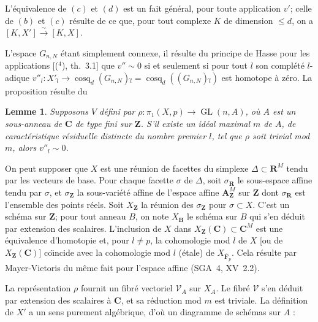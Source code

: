 \documentclass[10pt]{amsart}
\theoremstyle{plain}
\newtheorem*{lemme}{Lemme}
\theoremstyle{remark}
\DeclareMathOperator{\cosq}{cosq}
\begin{document}
\vspace{0.3\baselineskip}

L'\'{e}quivalence de $(c)$ et $(d)$ est un fait g\'{e}n\'{e}ral, pour toute application $v'$; celle de $(b)$ et $(c)$ r\'{e}sulte de ce que, pour tout complexe $K$ de dimension $\le d$, on a $[K,X']\xrightarrow{\sim}[K,X]$.

L'espace $G_{n,N}$ \'{e}tant simplement connexe, il r\'{e}sulte du principe de Hasse pour les applications [($^4$), th.~3.1] que $v''\sim0$ si et seulement si pour tout $l$ son compl\'{e}t\'{e} $l$-adique $v''_l:X'\hat{{}_l}\to\cosq_d(G_{n,N})\hat{{}_l}=\cosq_d((G_{n,N})\hat{{}_l})$ est homotope \`{a} z\'{e}ro. La proposition r\'{e}sulte du

\begin{lemme}
Supposons $V$ d\'{e}fini par $\rho:\pi_1(X,p)\to\operatorname{GL}(n,A)$, o\`{u} $A$ est un sous-anneau de $\mathbf{C}$ de type fini sur $\mathbf{Z}$. S'il existe un id\'{e}al maximal $m$ de $A$, de caract\'{e}ristique r\'{e}siduelle distincte du nombre premier $l$, tel que $\rho$ soit trivial mod $m$, alors $v''_l\sim0$.
\end{lemme}

On peut supposer que $X$ est une r\'{e}union de facettes du simplexe $\Delta\subset\mathbf{R}^M$ tendu par les vecteurs de base. Pour chaque facette $\sigma$ de $\Delta$, soit $\sigma_{\mathbf{R}}$ le sous-espace affine tendu par $\sigma$, et $\sigma_{\mathbf{Z}}$ la sous-vari\'{e}t\'{e} affine de l'espace affine $\mathbf{A}^M_{\mathbf{Z}}$ sur $\mathbf{Z}$ dont $\sigma_{\mathbf{R}}$ est l'ensemble des points r\'{e}els. Soit $X_{\mathbf{Z}}$ la r\'{e}union des $\sigma_{\mathbf{Z}}$ pour $\sigma\subset X$. C'est un sch\'{e}ma sur $\mathbf{Z}$; pour tout anneau $B$, on note $X_{\mathbf{B}}$ le sch\'{e}ma sur $B$ qui s'en d\'{e}duit par extension des scalaires. L'inclusion de $X$ dans $X_{\mathbf{Z}}(\mathbf{C})\subset\mathbf{C}^M$ est une \'{e}quivalence d'homotopie et, pour $l\ne p$, la cohomologie mod $l$ de $X$ [ou de $X_{\mathbf{Z}}(\mathbf{C})$] co\"{\i}ncide avec la cohomologie mod $l$ (\'{e}tale) de $X_{\overline{\mathbf{F}}_p}$. Cela r\'{e}sulte par Mayer-Vietoris du m\^{e}me fait pour l'espace affine (SGA~4, XV~2.2).

La repr\'{e}sentation $\rho$ fournit un fibr\'{e} vectoriel $\mathscr{V}_A$ sur $X_A$. Le fibr\'{e} $\mathscr{V}$ s'en d\'{e}duit par extension des scalaires \`{a} $\mathbf{C}$, et sa r\'{e}duction mod $m$ est triviale. La d\'{e}finition de $X'$ a un sens purement alg\'{e}brique, d'o\`{u} un diagramme de sch\'{e}mas sur $A$ :
\end{document}
